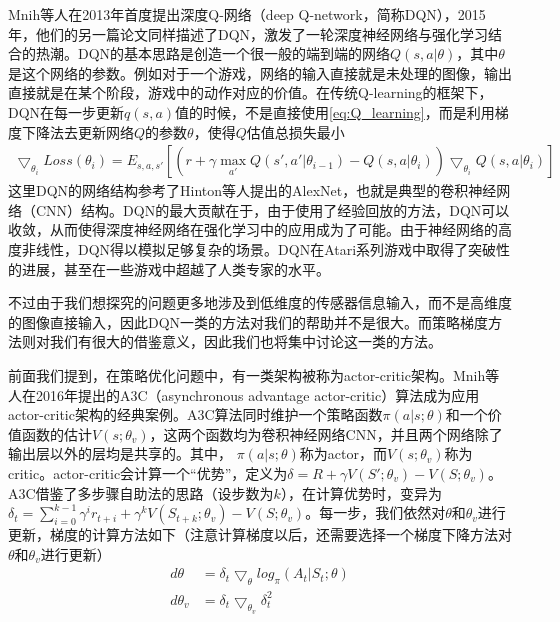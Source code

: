       Mnih等人在2013年首度提出深度Q-网络（deep Q-network，简称DQN）\cite{atari_2013}，2015年，他们的另一篇论文同样描述了DQN\cite{nature2015}，激发了一轮深度神经网络与强化学习结合的热潮\cite{deepRL_overview}。DQN的基本思路是创造一个很一般的端到端的网络$Q(s, a | \theta)$，其中$\theta$是这个网络的参数。例如对于一个游戏，网络的输入直接就是未处理的图像，输出直接就是在某个阶段，游戏中的动作对应的价值。在传统Q-learning的框架下，DQN在每一步更新$q(s, a)$值的时候，不是直接使用\eqref{eq:Q_learning}，而是利用梯度下降法去更新网络$Q$的参数$\theta$，使得$Q$估值总损失最小
      \begin{align*}
        \bigtriangledown_{\theta_i}Loss(\theta_i) = E_{s, a, s'}[(r+\gamma \max_{a'}Q(s', a'|\theta_{i-1}) - Q(s, a|\theta_i))\bigtriangledown_{\theta_i}Q(s, a|\theta_i)]
      \end{align*}
      这里DQN的网络结构参考了Hinton等人提出的AlexNet\cite{AlexNet}，也就是典型的卷积神经网络（CNN）结构。DQN的最大贡献在于，由于使用了经验回放的方法，DQN可以收敛，从而使得深度神经网络在强化学习中的应用成为了可能。由于神经网络的高度非线性，DQN得以模拟足够复杂的场景。DQN在Atari系列游戏中取得了突破性的进展，甚至在一些游戏中超越了人类专家的水平。\par
      不过由于我们想探究的问题更多地涉及到低维度的传感器信息输入，而不是高维度的图像直接输入，因此DQN一类的方法对我们的帮助并不是很大。而策略梯度方法则对我们有很大的借鉴意义，因此我们也将集中讨论这一类的方法。\par
      前面我们提到，在策略优化问题中，有一类架构被称为actor-critic架构。Mnih等人在2016年提出的A3C（asynchronous advantage actor-critic）算法\cite{A3C}成为应用actor-critic架构的经典案例。A3C算法同时维护一个策略函数$\pi(a|s; \theta)$和一个价值函数的估计$V(s; \theta_v )$，这两个函数均为卷积神经网络CNN，并且两个网络除了输出层以外的层均是共享的。其中， $\pi(a|s; \theta)$称为actor，而$V(s; \theta_v )$称为critic。actor-critic会计算一个``优势''，定义为$\delta = R + \gamma V(S'; \theta_v) - V(S; \theta_v)$\cite{Sutton_book}。A3C借鉴了多步骤自助法的思路（设步数为$k$），在计算优势时，变异为$\delta_t = \sum_{i = 0}^{k - 1}\gamma^i r_{t+i} + \gamma^k V(S_{t+k}; \theta_v) - V(S; \theta_v)$。每一步，我们依然对$\theta$和$\theta_v$进行更新，梯度的计算方法如下（注意计算梯度以后，还需要选择一个梯度下降方法对$\theta$和$\theta_v$进行更新）
      \begin{align}
      \label{eq:A3C_gradient1}
          d\theta &= \delta_t \bigtriangledown_{\theta} log_\pi(A_t|S_t; \theta)\\
      \label{eq:A3C_gradient2}
          d\theta_v &= \delta_t \bigtriangledown_{\theta_v} \delta_t^2
      \end{align}
